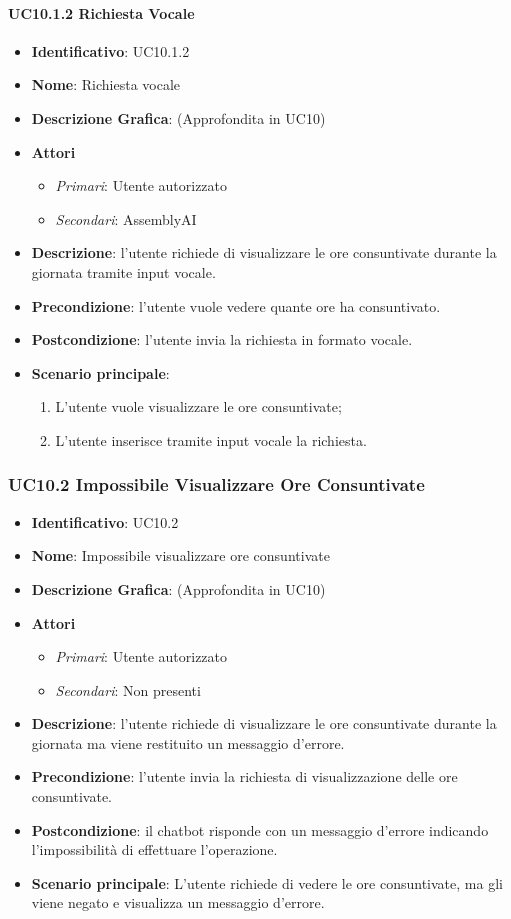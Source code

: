 \paragraph{UC10.1.2 Richiesta Vocale}
\begin{itemize}
	\item \textbf{Identificativo}: UC10.1.2
	\item \textbf{Nome}: Richiesta vocale
	\item \textbf{Descrizione Grafica}: (Approfondita in UC10)
	\item \textbf{Attori}
	\begin{itemize}
		\item \textit{Primari}: Utente autorizzato
		\item \textit{Secondari}: AssemblyAI
	\end{itemize}
	\item \textbf{Descrizione}: l'utente richiede di visualizzare le ore consuntivate durante la giornata tramite input vocale.
	\item \textbf{Precondizione}: l'utente vuole vedere quante ore ha consuntivato.
	\item \textbf{Postcondizione}: l'utente invia la richiesta in formato vocale.
	\item \textbf{Scenario principale}: 
	\begin{enumerate}
		\item L'utente vuole visualizzare le ore consuntivate;
		\item L'utente inserisce tramite input vocale la richiesta.
	\end{enumerate}
\end{itemize}

\subsubsection{UC10.2 Impossibile Visualizzare Ore Consuntivate}
\begin{itemize}
	\item \textbf{Identificativo}: UC10.2
	\item \textbf{Nome}: Impossibile visualizzare ore consuntivate
	\item \textbf{Descrizione Grafica}: (Approfondita in UC10)
	\item \textbf{Attori}
	\begin{itemize}
		\item \textit{Primari}: Utente autorizzato
		\item \textit{Secondari}: Non presenti
	\end{itemize}
	\item \textbf{Descrizione}: l'utente richiede di visualizzare le ore consuntivate durante la giornata ma viene restituito un messaggio d'errore.
	\item \textbf{Precondizione}: l'utente invia la richiesta di visualizzazione delle ore consuntivate.
	\item \textbf{Postcondizione}: il chatbot risponde con un messaggio d'errore indicando l'impossibilità di effettuare l'operazione.
	\item \textbf{Scenario principale}: L'utente richiede di vedere le ore consuntivate, ma gli viene negato e visualizza un messaggio d'errore.
\end{itemize}
\newpage